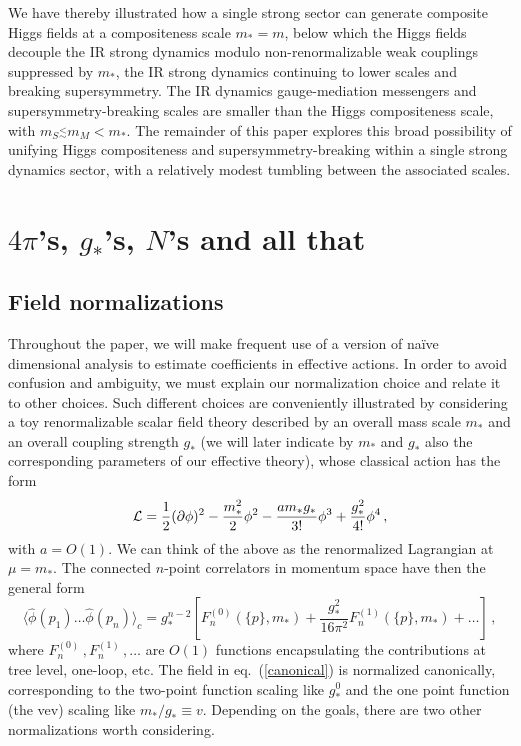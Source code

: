 \documentclass[a4paper,12pt]{article}
\newcommand{\lsim}{\stackrel{<}{_\sim}}
\newcommand{\beq}{\begin{equation}}
\newcommand{\eeq}{\end{equation}}
\def\eq#1{eq.~(\ref{#1})}
\def\eq#1{eq.~(\ref{#1})}
\def\mst{m_*}
\def\mS{m_S}
\begin{document}
We have thereby illustrated how a single strong sector can generate  composite Higgs fields at a compositeness scale $\mst = m$, below which the Higgs fields decouple the IR strong dynamics modulo non-renormalizable weak couplings suppressed by $\mst$, the IR strong dynamics continuing to lower scales and breaking supersymmetry. The IR dynamics gauge-mediation messengers and supersymmetry-breaking scales are smaller than the Higgs compositeness scale, with $\mS \lsim m_M < \mst$. The remainder of this paper explores this broad possibility of unifying Higgs compositeness and supersymmetry-breaking within a single strong dynamics sector, with a relatively modest tumbling between the associated scales.

\section{\boldmath $4\pi$'s, $g_*$'s, $N$'s and all that\unboldmath}
\boldmath
\label{sec:allthat}
\subsection{Field normalizations}
\unboldmath
Throughout the paper, we will make frequent use of a version of na\"ive dimensional analysis to estimate coefficients in effective actions. In order to avoid confusion and ambiguity, we must explain our normalization choice and relate it to other choices.
Such different choices are conveniently illustrated by considering a toy renormalizable scalar field theory described by an overall mass scale $\mst$ and an overall coupling strength $g_*$ (we will later indicate by $\mst$ and $g_*$ also the corresponding parameters of our effective theory), whose classical action has the form 
\beq
{\cal L} =\frac{1}{2} (\partial \phi)^2-\frac{\mst^2}{2}\phi^2-\frac{a \mst g_*}{3!}\phi^3+\frac{g_*^2}{4!}\phi^4\,,
\label{canonical}
\eeq
with $a=O(1)$. We can think of the above as the renormalized Lagrangian at $\mu=\mst$. The connected $n$-point correlators in momentum space have then the general form
\beq
\langle \hat\phi(p_1)\dots\hat \phi(p_n)\rangle_c= g_*^{n-2}\left [F_n^{(0)}(\{p\},\mst)+\frac{g_*^2}{16\pi^2}F_n^{(1)}(\{p\},\mst)+\dots\right ] \, ,
\eeq
where $F_n^{(0)}\,,F_n^{(1)}\,,\dots$ are $O(1)$ functions encapsulating the contributions at tree level, one-loop, etc.
The field in \eq{canonical} is normalized canonically, corresponding to the two-point function scaling like $g_*^0$ and the one point function (the vev)  scaling like $\mst/g_*\equiv v$. Depending on the goals, there are two other normalizations worth considering.
\end{document}

